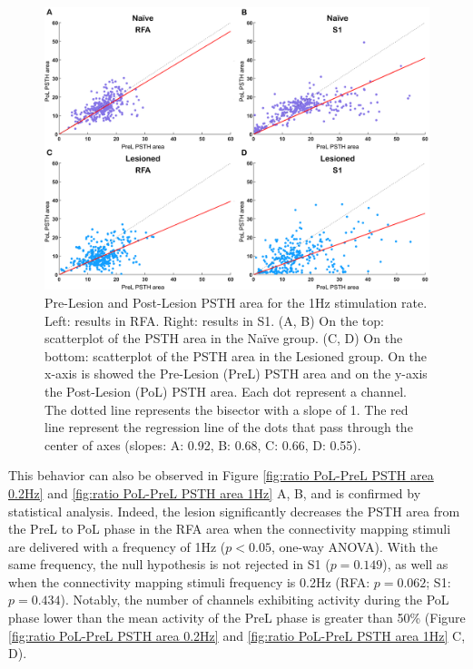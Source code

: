 \begin{figure}[ht!]
    \begin{center}
    \includegraphics[width=\linewidth]{Figure/Lesion Effect/Lesion Effect 1Hz.jpg}
    \end{center}
    \caption{Pre-Lesion and Post-Lesion PSTH area for the 1Hz stimulation rate. Left: results in RFA. Right: results in S1. (A, B) On the top: scatterplot of the PSTH area in the Naïve group. (C, D) On the bottom: scatterplot of the PSTH area in the Lesioned group. On the x-axis is showed the Pre-Lesion (PreL) PSTH area and on the y-axis the Post-Lesion (PoL) PSTH area. Each dot represent a channel. The dotted line represents the bisector with a slope of 1. The red line represent the regression line of the dots that pass through the center of axes (slopes: A: 0.92, B: 0.68, C: 0.66, D: 0.55).}
    \label{fig:Lesion Effect 1Hz}
\end{figure}

This behavior can also be observed in Figure \ref{fig:ratio PoL-PreL PSTH area 0.2Hz} and \ref{fig:ratio PoL-PreL PSTH area 1Hz} A, B, and is confirmed by statistical analysis. Indeed, the lesion significantly decreases the PSTH area from the PreL to PoL phase in the RFA area when the connectivity mapping stimuli are delivered with a frequency of 1Hz ($p<0.05$, one-way ANOVA). With the same frequency, the null hypothesis is not rejected in S1 ($p=0.149$), as well as when the connectivity mapping stimuli frequency is 0.2Hz (RFA: $p=0.062$; S1: $p=0.434$). Notably, the number of channels exhibiting activity during the PoL phase lower than the mean activity of the PreL phase is greater than 50\% (Figure \ref{fig:ratio PoL-PreL PSTH area 0.2Hz} and \ref{fig:ratio PoL-PreL PSTH area 1Hz} C, D).

